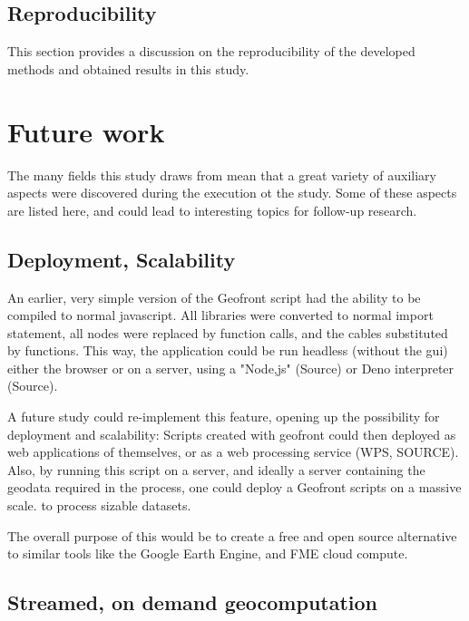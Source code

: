 \subsection*{Reproducibility}
This section provides a discussion on the reproducibility of the developed methods and obtained results in this study.



\section{Future work}
\label{sec:future-work}
The many fields this study draws from mean that a great variety of auxiliary aspects were discovered during the execution ot the study. 
Some of these aspects are listed here, and could lead to interesting topics for follow-up research. 

\subsection{Deployment, Scalability}
An earlier, very simple version of the Geofront script had the ability to be compiled to normal javascript.  
All libraries were converted to normal import statement, all nodes were replaced by function calls, and the cables substituted by functions. 
This way, the application could be run headless (without the \ac{gui}) either the browser or on a server, using a "Node,js" (Source) or Deno interpreter (Source).

A future study could re-implement this feature, opening up the possibility for deployment and scalability: 
Scripts created with geofront could then deployed as web applications of themselves, or as a web processing service (WPS, SOURCE).
Also, by running this script on a server, and ideally a server containing the geodata required in the process, one could deploy a Geofront scripts on a massive scale. to process sizable datasets.

The overall purpose of this would be to create a free and open source alternative to similar tools like the Google Earth Engine, and FME cloud compute. 

\subsection{Streamed, on demand geocomputation}

